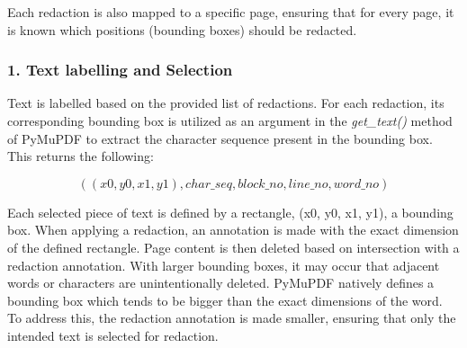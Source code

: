 Each redaction is also mapped to a specific page, ensuring that for every page, it is known which positions (bounding boxes) should be redacted.

\subsubsection{1. Text labelling and Selection}
Text is labelled based on the provided list of redactions. For each redaction, its corresponding bounding box is utilized as an argument in the \textit{get\_text()} method of PyMuPDF to extract the character sequence present in the bounding box. This returns the following:

\[((x0, y0, x1, y1), char\_seq, block\_no, line\_no, word\_no)\]

Each selected piece of text is defined by a rectangle, (x0, y0, x1, y1), a bounding box. When applying a redaction, an annotation is made with the exact dimension of the defined rectangle. Page content is then deleted based on intersection with a redaction annotation. With larger bounding boxes, it may occur that adjacent words or characters are unintentionally deleted. PyMuPDF natively defines a bounding box which tends to be bigger than the exact dimensions of the word. To address this, the redaction annotation is made smaller, ensuring that only the intended text is selected for redaction. 
